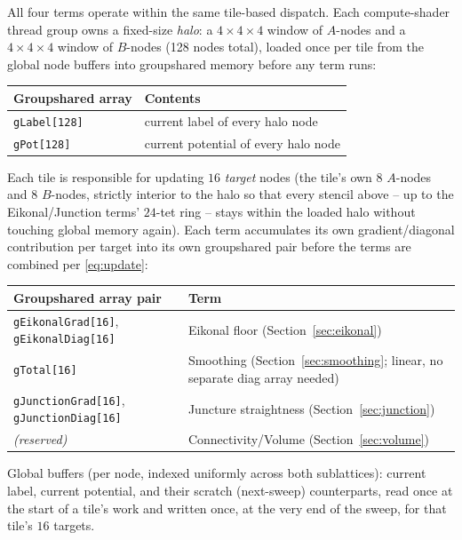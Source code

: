 \documentclass[11pt]{article}
\begin{document}
All four terms operate within the same tile-based dispatch. Each
compute-shader thread group owns a fixed-size \emph{halo}: a $4\times4
\times4$ window of $A$-nodes and a $4\times4\times4$ window of $B$-nodes
(128 nodes total), loaded once per tile from the global node buffers into
groupshared memory before any term runs:

\begin{center}
\begin{tabular}{@{}ll@{}}
\toprule
Groupshared array & Contents \\
\midrule
\texttt{gLabel[128]} & current label of every halo node \\
\texttt{gPot[128]} & current potential of every halo node \\
\bottomrule
\end{tabular}
\end{center}

Each tile is responsible for updating $16$ \emph{target} nodes (the
tile's own $8$ $A$-nodes and $8$ $B$-nodes, strictly interior to the halo
so that every stencil above -- up to the Eikonal/Junction terms' $24$-tet
ring -- stays within the loaded halo without touching global memory
again). Each term accumulates its own gradient/diagonal contribution per
target into its own groupshared pair before the terms are combined per
\eqref{eq:update}:

\begin{center}
\begin{tabular}{@{}ll@{}}
\toprule
Groupshared array pair & Term \\
\midrule
\texttt{gEikonalGrad[16]}, \texttt{gEikonalDiag[16]} & Eikonal floor (Section~\ref{sec:eikonal}) \\
\texttt{gTotal[16]} & Smoothing (Section~\ref{sec:smoothing}; linear, no separate diag array needed) \\
\texttt{gJunctionGrad[16]}, \texttt{gJunctionDiag[16]} & Juncture straightness (Section~\ref{sec:junction}) \\
\emph{(reserved)} & Connectivity/Volume (Section~\ref{sec:volume}) \\
\bottomrule
\end{tabular}
\end{center}

Global buffers (per node, indexed uniformly across both sublattices):
current label, current potential, and their scratch (next-sweep)
counterparts, read once at the start of a tile's work and written once, at
the very end of the sweep, for that tile's $16$ targets.
\end{document}
